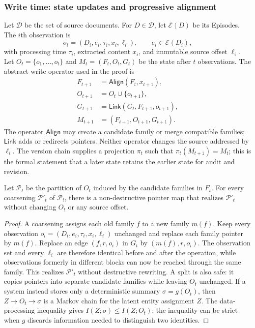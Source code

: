 \subsubsection{Write time: state updates and progressive alignment}

Let $\mathcal D$ be the set of source documents. For $D\in\mathcal D$, let $\mathcal E(D)$ be its Episodes. The $i$th observation is
\[
o_i=(D_i,e_i,\tau_i,x_i,\ell_i),
\qquad e_i\in\mathcal E(D_i),
\]
with processing time $\tau_i$, extracted content $x_i$, and immutable source offset $\ell_i$. Let $O_t=\{o_1,\ldots,o_t\}$ and $M_t=(F_t,O_t,G_t)$ be the state after $t$ observations. The abstract write operator used in the proof is
\begin{equation}
\begin{aligned}
F_{t+1}&=\mathsf{Align}(F_t,x_{t+1}),\\
O_{t+1}&=O_t\cup\{o_{t+1}\},\\
G_{t+1}&=\mathsf{Link}(G_t,F_{t+1},o_{t+1}),\\
M_{t+1}&=(F_{t+1},O_{t+1},G_{t+1}).
\end{aligned}
\label{eq:app-state-transition}
\end{equation}
The operator $\mathsf{Align}$ may create a candidate family or merge compatible families; $\mathsf{Link}$ adds or redirects pointers. Neither operator changes the source addressed by $\ell_i$. The version chain supplies a projection $\pi_t$ such that $\pi_t(M_{t+1})=M_t$; this is the formal statement that a later state retains the earlier state for audit and revision.

\begin{proposition}
\label{prop:revisability}
Let $\mathcal P_t$ be the partition of $O_t$ induced by the candidate families in $F_t$. For every coarsening $\mathcal P'_t$ of $\mathcal P_t$, there is a non-destructive pointer map that realizes $\mathcal P'_t$ without changing $O_t$ or any source offset.
\end{proposition}

\begin{proof}
A coarsening assigns each old family $f$ to a new family $m(f)$. Keep every observation $o_i=(D_i,e_i,\tau_i,x_i,\ell_i)$ unchanged and replace each family pointer by $m(f)$. Replace an edge $(f,r,o_i)$ in $G_t$ by $(m(f),r,o_i)$. The observation set and every $\ell_i$ are therefore identical before and after the operation, while observations formerly in different blocks can now be reached through the same family. This realizes $\mathcal P'_t$ without destructive rewriting. A split is also safe: it copies pointers into separate candidate families while leaving $O_t$ unchanged. If a system instead stores only a deterministic summary $\sigma=g(O_t)$, then $Z\to O_t\to\sigma$ is a Markov chain for the latent entity assignment $Z$. The data-processing inequality gives $I(Z;\sigma)\le I(Z;O_t)$; the inequality can be strict when $g$ discards information needed to distinguish two identities.
\end{proof}

